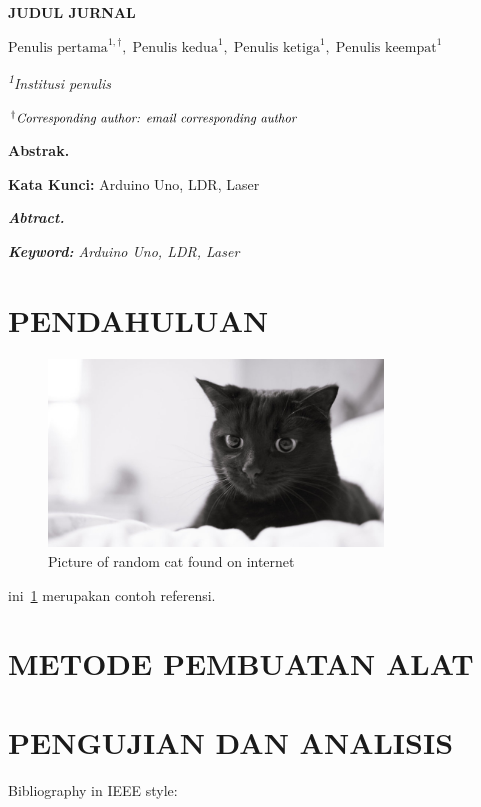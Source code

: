 \documentclass[11pt, a4paper]{article}
\begin{document}
\begin{center}
    {\textbf{\Large JUDUL JURNAL}}\par
    \vspace{12pt}
    $\text{Penulis pertama}^{1, \dagger},\;\text{Penulis kedua}^1,\;\text{Penulis ketiga}^1,\;\text{Penulis keempat}^1$\par
    \vspace{11pt}
    {\textit{\small \textsuperscript{1}Institusi penulis}}\par
    $^\dagger \text{{\textit{\small Corresponding author: email corresponding author}}}$
\end{center}
\vspace{11pt}
\noindent \textbf{Abstrak.} \lipsum[1]\par
\vspace{11pt}
\noindent \textbf{Kata Kunci:} Arduino Uno, LDR, Laser\par
\vspace{11pt}
\noindent \textit{\textbf{Abtract.} \lipsum[1]}\par
\vspace{11pt}
\noindent \textit{\textbf{Keyword:} Arduino Uno, LDR, Laser}\par

\section{PENDAHULUAN}
\begin{figure}[H]
    \centering
    \includegraphics[height=5cm]{random-cat}
    \caption{Picture of random cat found on internet}\label{gambar:random-cat}
\end{figure}
ini~\cref{gambar:random-cat} merupakan contoh referensi.
\lipsum[1]
\section{METODE PEMBUATAN ALAT}
\lipsum[1]
\section{PENGUJIAN DAN ANALISIS}
Bibliography in IEEE style:
\end{document}

